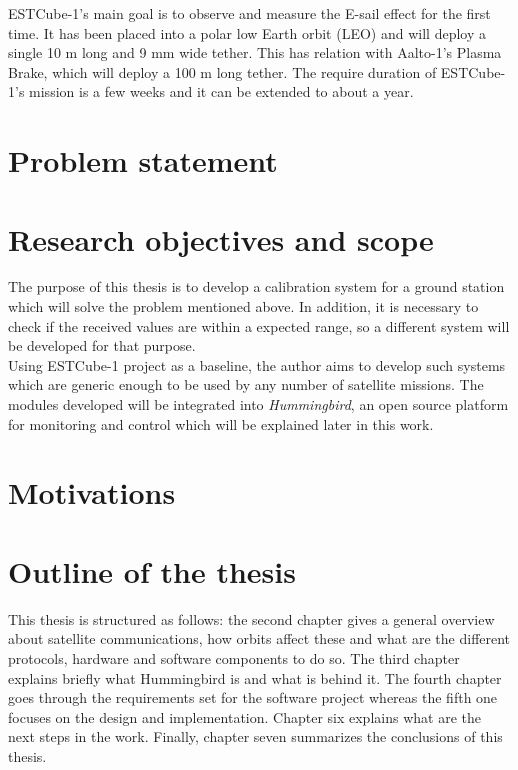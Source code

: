 ESTCube-1's main goal is to observe and measure the E-sail effect for the first time. It has been placed into a polar low Earth orbit (LEO) and will deploy a single 10 m long and 9 mm wide tether\cite{ESTCube}. This has relation with Aalto-1's Plasma Brake, which will deploy a 100 m long tether. The require duration of ESTCube-1's mission is a few weeks and it can be extended to about a year.



\section{Problem statement}\label{1.2}




\section{Research objectives and scope}

The purpose of this thesis is to develop a calibration system for a ground station which will solve the problem mentioned above. In addition, it is necessary to check if the received values are within a expected range, so a different system will be developed for that purpose.\\

Using ESTCube-1 project as a baseline, the author aims to develop such systems which are generic enough to be used by any number of satellite missions. The modules developed will be integrated into \emph{Hummingbird}, an open source platform for monitoring and control which will be explained later in this work. 





\section{Motivations}



\section{Outline of the thesis}
This thesis is structured as follows: the second chapter gives a general overview about satellite communications, how orbits affect these and what are the different protocols, hardware and software components to do so. The third chapter explains briefly what Hummingbird is and what is behind it. The fourth chapter goes through the requirements set for the software project whereas the fifth one focuses on the design and implementation. Chapter six explains what are the next steps in the work. Finally, chapter seven summarizes the conclusions of this thesis.

\newpage
